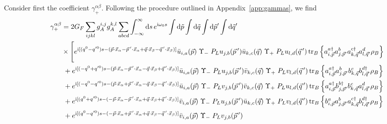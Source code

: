 \documentclass[aps,prd,10pt,twocolumn,superscriptaddress,floatfix,nofootinbib,amsmath,amssymb,altaffilletter,preprintnumbers]{revtex4-1}
\begin{document}
Consider first the coefficient $\gamma^{\alpha \beta}_{+}$.  Following the procedure outlined in Appendix~\ref{app:gammas}, we find
\begin{equation}
\begin{aligned}
 \gamma^{\alpha \beta}_{+} &= 2 G_F \sum_{ijkl} g_A^{i,j} g_A^{k,l} 
    \sum_{abcd} \int_{-\infty}^{\infty} {\rm d} s\, e^{{\rm i}\omega_0 s} 
    \int {\rm d}\tilde{p} \int {\rm d}\tilde{q} \int {\rm d}\tilde{p}' \int {\rm d}\tilde{q}' \\
    &\times \Bigg[ e^{{\rm i}[(q^0-q'^0)s-(\vec{p}\cdot\vec{x}_\alpha - \vec{p}\,'\cdot\vec{x}_\alpha + \vec{q}\cdot\vec{x}_\beta - \vec{q}\,'\cdot\vec{x}_\beta)]}
    \bar{u}_{i,a}(\vec{p}) \; \Upsilon_- \;P_L u_{j,b}(\vec{p}\,') 
    \bar{u}_{k,c}(\vec{q})\; \Upsilon_+\;P_L u_{l,d}(\vec{q}\,') \, \text{tr}_B\left\{ 
        a^{a \dag}_{i,\vec{p}} a^b_{j,\vec{p}'} 
        a^{c \dag}_{k,\vec{q}} a^{d}_{l,\vec{q}'} \rho_B 
    \right\} \\
    &\;  +e^{{\rm i}[(-q^0+q'^0)s-(\vec{p}\cdot\vec{x}_\alpha - \vec{p}\,'\cdot\vec{x}_\alpha - \vec{q}\cdot\vec{x}_\beta + \vec{q}\,'\cdot\vec{x}_\beta)]}
    \bar{u}_{i,a}(\vec{p}) \; \Upsilon_- \; P_L u_{j,b}(\vec{p}\,') 
    \bar{v}_{k,c}(\vec{q}) \; \Upsilon_+\;P_L v_{l,d}(\vec{q}\,') \,  \text{tr}_B\left\{ 
        a^{a \dag}_{i,\vec{p}} a^b_{j,\vec{p}'} 
    b^{c}_{k,\vec{q}} b^{d  \dag}_{l,\vec{q}'} \rho_B 
    \right\} \\
    &\;  +e^{{\rm i}[(-q^0-q'^0)s-(\vec{p}\cdot\vec{x}_\alpha + \vec{p}\,'\cdot\vec{x}_\alpha - \vec{q}\cdot\vec{x}_\beta - \vec{q}\,'\cdot\vec{x}_\beta)]}
    \bar{u}_{i,a}(\vec{p}) \; \Upsilon_- \;P_L v_{j,b}(\vec{p}\,') 
    \bar{v}_{k,c}(\vec{q}) \; \Upsilon_+\;P_L u_{l,d}(\vec{q}\,') \,  \text{tr}_B\left\{ 
        a^{a \dag}_{i,\vec{p}} b^{b \dag}_{j,\vec{p}'} 
    b^{c}_{k,\vec{q}} a^{d }_{l,\vec{q}'} \rho_B 
    \right\} \\
    &\;  +e^{{\rm i}[(q^0+q'^0)s-(-\vec{p}\cdot\vec{x}_\alpha - \vec{p}\,'\cdot\vec{x}_\alpha + \vec{q}\cdot\vec{x}_\beta + \vec{q}\,'\cdot\vec{x}_\beta)]}
    \bar{v}_{i,a}(\vec{p}) \; \Upsilon_- \;P_L u_{j,b}(\vec{p}\,') 
    \bar{u}_{k,c}(\vec{q}) \; \Upsilon_+\;P_L v_{l,d}(\vec{q}\,') \,
 \text{tr}_B\left\{ 
        b^{a}_{i,\vec{p}} a^{b }_{j,\vec{p}'} 
    a^{c \dag}_{k,\vec{q}} b^{d \dag}_{l,\vec{q}'} \rho_B 
    \right\} \\
    &\;  +e^{{\rm i}[(q^0-q'^0)s-(-\vec{p}\cdot\vec{x}_\alpha + \vec{p}\,'\cdot\vec{x}_\alpha + \vec{q}\cdot\vec{x}_\beta - \vec{q}\,'\cdot\vec{x}_\beta)]}
    \bar{v}_{i,a}(\vec{p}) \; \Upsilon_- \;P_L v_{j,b}(\vec{p}\,') 

\end{aligned}
\end{equation}
\end{document}
